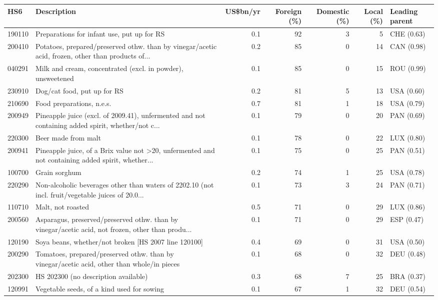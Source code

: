 \begin{tabular}{@{}l p{6.4cm} r r r r l@{}}
\toprule
HS6 & Description & US\$bn/yr & Foreign (\%) & Domestic (\%) & Local (\%) & Leading parent \\
\midrule
190110 & Preparations for infant use, put up for RS & 0.1 & 92 & 3 & 5 & CHE (0.63) \\
200410 & Potatoes, prepared/\allowbreak{}preserved othw. than by vinegar/\allowbreak{}acetic acid, frozen, other than products of... & 0.2 & 85 & 0 & 14 & CAN (0.98) \\
040291 & Milk and cream, concentrated (excl. in powder), unsweetened & 0.1 & 85 & 0 & 15 & ROU (0.99) \\
230910 & Dog/\allowbreak{}cat food, put up for RS & 0.2 & 81 & 5 & 13 & USA (0.60) \\
210690 & Food preparations, n.e.s. & 0.7 & 81 & 1 & 18 & USA (0.79) \\
200949 & Pineapple juice (excl. of 2009.41), unfermented and not containing added spirit, whether/\allowbreak{}not c... & 0.1 & 79 & 0 & 20 & PAN (0.69) \\
220300 & Beer made from malt & 0.1 & 78 & 0 & 22 & LUX (0.80) \\
200941 & Pineapple juice, of a Brix value not >20, unfermented and not containing added spirit, whether... & 0.1 & 75 & 0 & 25 & PAN (0.51) \\
100700 & Grain sorghum & 0.2 & 74 & 1 & 25 & USA (0.78) \\
220290 & Non-alcoholic beverages other than waters of 2202.10 (not incl. fruit/\allowbreak{}vegetable juices of 20.0... & 0.1 & 73 & 3 & 24 & PAN (0.71) \\
110710 & Malt, not roasted & 0.5 & 71 & 0 & 29 & LUX (0.86) \\
200560 & Asparagus, preserved/\allowbreak{}preserved othw. than by vinegar/\allowbreak{}acetic acid, not frozen, other than produ... & 0.1 & 71 & 0 & 29 & ESP (0.47) \\
120190 & Soya beans, whether/\allowbreak{}not broken [HS 2007 line 120100] & 0.4 & 69 & 0 & 31 & USA (0.50) \\
200290 & Tomatoes, prepared/\allowbreak{}preserved othw. than by vinegar/\allowbreak{}acetic acid, other than whole/\allowbreak{}in pieces & 0.1 & 68 & 0 & 32 & DEU (0.48) \\
202300 & HS 202300 (no description available) & 0.3 & 68 & 7 & 25 & BRA (0.37) \\
120991 & Vegetable seeds, of a kind used for sowing & 0.1 & 67 & 1 & 32 & DEU (0.54) \\

\end{tabular}
